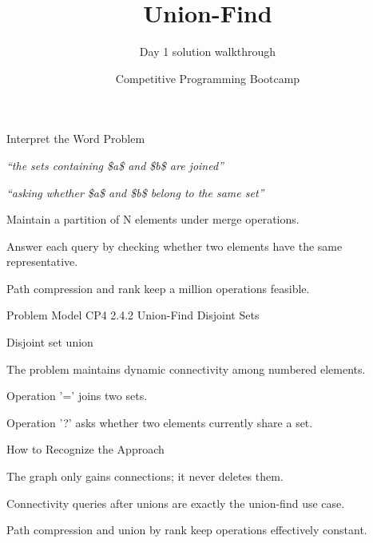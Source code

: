 \documentclass[aspectratio=169,11pt]{beamer}
\title[unionfind]{Union-Find}
\subtitle{Day 1 solution walkthrough}
\author[Solution Deck]{Competitive Programming Bootcamp}
\date{}
\begin{document}
\begin{frame}[plain]
  \titlepage
\end{frame}

\begin{frame}{Interpret the Word Problem}
\small
{}
\begin{tightitemize}
  \item \textit{``the sets containing \$a\$ and \$b\$ are joined''}
  \item \textit{``asking whether \$a\$ and \$b\$ belong to the same set''}
\end{tightitemize}

\vspace{0.18cm}
\begin{tightitemize}
  \item Maintain a partition of N elements under merge operations.
  \item Answer each query by checking whether two elements have the same representative.
  \item Path compression and rank keep a million operations feasible.
\end{tightitemize}
\end{frame}







\begin{frame}{Problem Model}
\small
{} CP4 2.4.2 Union-Find Disjoint Sets

\vspace{0.25cm}
 Disjoint set union

\vspace{0.25cm}
\begin{tightitemize}
  \item The problem maintains dynamic connectivity among numbered elements.
  \item Operation '=' joins two sets.
  \item Operation '?' asks whether two elements currently share a set.
\end{tightitemize}
\end{frame}

\begin{frame}{How to Recognize the Approach}
\begin{tightitemize}
  \item The graph only gains connections; it never deletes them.
  \item Connectivity queries after unions are exactly the union-find use case.
  \item Path compression and union by rank keep operations effectively constant.
\end{tightitemize}
\end{frame}
\end{document}
